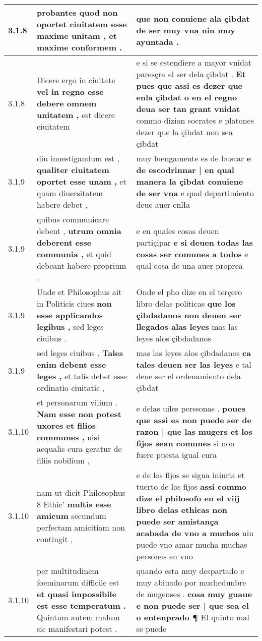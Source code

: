 \begin{tabular}{|p{1cm}|p{6.5cm}|p{6.5cm}|}
3.1.8 & probantes quod non oportet ciuitatem \textbf{ esse maxime unitam , } et maxime conformem . & que non conuiene ala çibdat \textbf{ de ser muy vna } nin muy ayuntada . \\\hline
3.1.8 & Dicere ergo in ciuitate \textbf{ vel in regno esse debere omnem unitatem , } est dicere ciuitatem & e si se estendiere a mayor vnidat paresçra el ser dela çibdat . \textbf{ Et pues que assi es dezer que enla çibdat o en el regno deua ser tan grant vnidat } commo dizian socrates e platones dezer que la çibdat non sea çibdat \\\hline
3.1.9 & diu inuestigandum est , \textbf{ qualiter ciuitatem oportet esse unam , } et quam diuersitatem habere debet , & muy luengamente es de buscar \textbf{ e de escodrinnar | en qual manera la çibdat conuiene de ser vna } e qual departimiento deue auer enlła \\\hline
3.1.9 & quibus communicare debent , \textbf{ utrum omnia deberent esse communia , } et quid debeant habere proprium . & e en quales cosas deuen partiçipar \textbf{ e si deuen todas las cosas ser comunes a todos } e qual cosa de una auer proprea \\\hline
3.1.9 & Unde et Philosophus ait in Politicis ciues \textbf{ non esse applicandos legibus , } sed leges ciuibus . & Onde el pho dize en el terçero libro delas politicas \textbf{ que los çibdadanos non deuen ser llegados alas leyes } mas las leyes alos çibdadanos \\\hline
3.1.9 & sed leges ciuibus . \textbf{ Tales enim debent esse leges , } et talis debet esse ordinatio ciuitatis , & mas las leyes alos çibdadanos \textbf{ ca tales deuen ser las leyes } e tal deue ser el ordenamiento dela çibdat \\\hline
3.1.10 & et personarum vilium . \textbf{ Nam esse non potest uxores et filios communes , } nisi aequalis cura geratur de filiis nobilium , & e delas uiles perssonas . \textbf{ poues que assi es non puede ser de razon | que las mugers et los fijos sean comunes } si non fuere puesta igual cura \\\hline
3.1.10 & nam ut dicit Philosophus 8 Ethic’ \textbf{ multis esse amicum } secundum perfectam amicitiam non contingit , & e de los fijos se sigua iniuria et tuerto de los fijos \textbf{ assi commo dize el philosofo en el viij libro delas ethicas non puede ser amistança acabada de vno a muchos } nin puede vno amar mucha muchas personas en vno \\\hline
3.1.10 & per multitudinem foeminarum difficile est \textbf{ et quasi impossibile est esse temperatum . } Quintum autem malum sic manifestari potest . & quando esta muy despartado e muy abiuado por muchedunbre de mugenses . \textbf{ cosa muy guaue e non puede ser | que sea el o entenprado ¶ } El quinto mal se puede \\\hline

\end{tabular}
